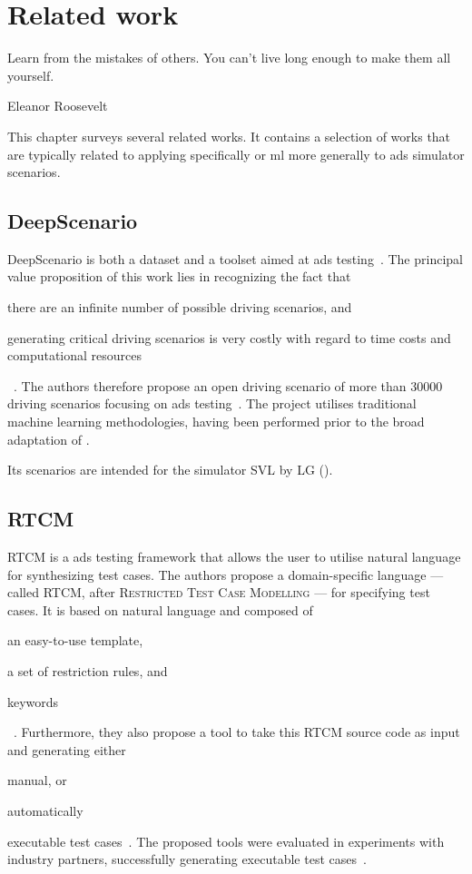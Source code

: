\chapter{Related work}\label{sec:relatedWork}

\epigraph{Learn from the mistakes of others. You can't live long enough to make them all yourself.}{Eleanor Roosevelt}

This chapter surveys several related works. It contains a selection of works that are typically
related to applying  specifically or \acrshort{ml} more generally to \acrshort{ads}
simulator scenarios.

\section{DeepScenario}\label{sec:deepScenario}

DeepScenario is both a dataset and a toolset aimed at \acrlong{ads} testing~\cite{DeepScenario}. The
principal value proposition of this work lies in recognizing the fact that \begin{inparaenum}
  \item there are an infinite number of possible driving scenarios, and
  \item generating critical driving scenarios is very costly with regard to time costs and
  computational resources\end{inparaenum}~\cite[52]{DeepScenario}. The authors therefore propose
an open driving scenario of more than \num{30000} driving scenarios focusing on \acrshort{ads}
testing~\cite[52]{DeepScenario}. The project utilises traditional machine learning
methodologies, having been performed prior to the broad adaptation of .

Its scenarios are intended for the simulator SVL by LG ().

\section{RTCM}

RTCM is a \acrshort{ads} testing framework that allows the user to utilise natural language for
synthesizing test cases. The authors propose a domain-specific language --- called RTCM, after
\textsc{Restricted Test Case Modelling} --- for specifying test cases. It is based on natural language
and composed of \begin{inparaenum}
  \item an easy-to-use template,
  \item a set of restriction rules, and
  \item keywords \end{inparaenum}~\cite[397]{RTCM}.  Furthermore, they also propose a tool to
take this RTCM source code as input and generating either \begin{inparaenum}
  \item manual, or
  \item automatically \end{inparaenum} executable test cases~\cite[397]{RTCM}. The proposed tools
were evaluated in experiments with industry partners, successfully generating executable test
cases~\cite[397]{RTCM}.

